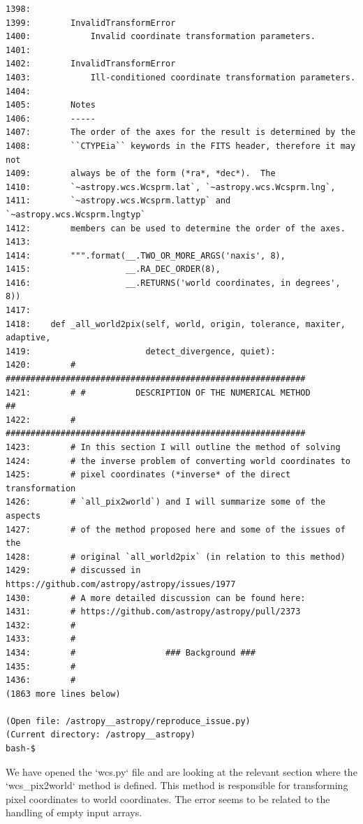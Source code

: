 {\begin{observationbox}
\begin{Verbatim}[breaklines=true, breakanywhere=true]
1398:
1399:        InvalidTransformError
1400:            Invalid coordinate transformation parameters.
1401:
1402:        InvalidTransformError
1403:            Ill-conditioned coordinate transformation parameters.
1404:
1405:        Notes
1406:        -----
1407:        The order of the axes for the result is determined by the
1408:        ``CTYPEia`` keywords in the FITS header, therefore it may not
1409:        always be of the form (*ra*, *dec*).  The
1410:        `~astropy.wcs.Wcsprm.lat`, `~astropy.wcs.Wcsprm.lng`,
1411:        `~astropy.wcs.Wcsprm.lattyp` and `~astropy.wcs.Wcsprm.lngtyp`
1412:        members can be used to determine the order of the axes.
1413:
1414:        """.format(__.TWO_OR_MORE_ARGS('naxis', 8),
1415:                   __.RA_DEC_ORDER(8),
1416:                   __.RETURNS('world coordinates, in degrees', 8))
1417:
1418:    def _all_world2pix(self, world, origin, tolerance, maxiter, adaptive,
1419:                       detect_divergence, quiet):
1420:        # ############################################################
1421:        # #          DESCRIPTION OF THE NUMERICAL METHOD            ##
1422:        # ############################################################
1423:        # In this section I will outline the method of solving
1424:        # the inverse problem of converting world coordinates to
1425:        # pixel coordinates (*inverse* of the direct transformation
1426:        # `all_pix2world`) and I will summarize some of the aspects
1427:        # of the method proposed here and some of the issues of the
1428:        # original `all_world2pix` (in relation to this method)
1429:        # discussed in https://github.com/astropy/astropy/issues/1977
1430:        # A more detailed discussion can be found here:
1431:        # https://github.com/astropy/astropy/pull/2373
1432:        #
1433:        #
1434:        #                  ### Background ###
1435:        #
1436:        #
(1863 more lines below)

(Open file: /astropy__astropy/reproduce_issue.py)
(Current directory: /astropy__astropy)
bash-$
\end{Verbatim}
\end{observationbox}
\begin{agentbox}
We have opened the `wcs.py` file and are looking at the relevant section where the `wcs\_pix2world` method is defined. This method is responsible for transforming pixel coordinates to world coordinates. The error seems to be related to the handling of empty input arrays.




\end{agentbox}}
